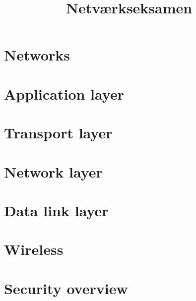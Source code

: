 \documentclass[12pt]{report}
\title{
	{Netværkseksamen}\\
}
\author{

}
\date{

}
\begin{document}
\maketitle

\tableofcontents

\chapter{Networks}


\chapter{Application layer}


\chapter{Transport layer}


\chapter{Network layer}


\chapter{Data link layer}


\chapter{Wireless}


\chapter{Security overview}

\end{document}
